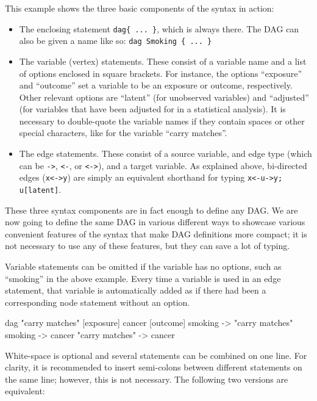 \documentclass[a4paper]{article} %
\begin{document}
This example shows the three basic components of the syntax in action:
\begin{itemize}
\item The enclosing statement \verb'dag{ ... }', which is always there. The DAG can also be given a name like so: \verb'dag Smoking { ... }'

\item The variable (vertex) statements. These consist of a variable name and a list of options enclosed in square brackets. For instance, the options ``exposure'' and ``outcome'' set a variable to be an exposure or outcome, respectively. Other relevant options are ``latent'' (for unobserved variables) and ``adjusted'' (for variables that have been adjusted for in a statistical analysis). It is necessary to double-quote the variable names if they contain spaces or other special characters, like for the variable ``carry matches''.

\item The edge statements. These consist of a source variable, and edge type (which can be  \verb|->|, \verb|<-|, or \verb|<->|), and a target variable. As explained above, bi-directed edges (\verb|x<->y|) are simply an equivalent shorthand for typing \verb|x<-u->y; u[latent]|.  
\end{itemize}

These three syntax components are in fact enough to define any DAG. We are now going to define the same DAG in various different ways to showcase various convenient features of the syntax that make DAG definitions more compact; it is not necessary to use any of these features, but they can save a lot of typing.

Variable statements can be omitted if the variable has no options, such as ``smoking'' in the above example. Every time a variable is used in an edge statement, that variable is automatically added as if there had been a corresponding node statement without an option.

\begin{dagcode}
dag{ 
  "carry matches" [exposure]
  cancer [outcome]
  smoking -> "carry matches"
  smoking -> cancer
  "carry matches" -> cancer
}
\end{dagcode}


White-space is optional and several statements can be combined on one line. For clarity, it is recommended to insert semi-colons between different statements on the same line; however, this is not necessary. The following two versions are equivalent:
\end{document}
